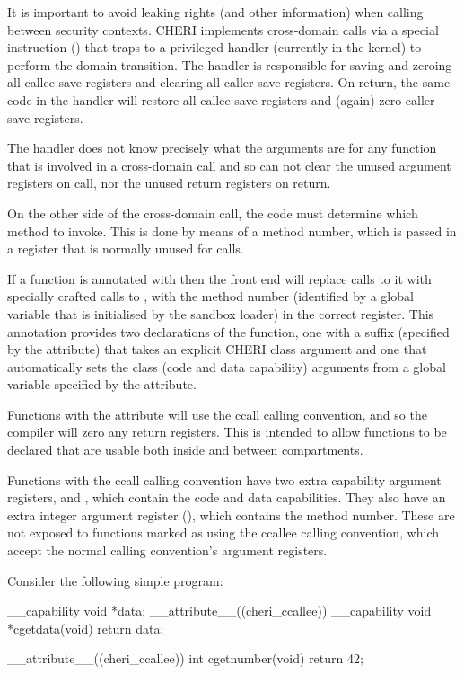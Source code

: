 It is important to avoid leaking rights (and other information) when calling between security contexts.  CHERI implements cross-domain calls via a special instruction () that traps to a privileged handler (currently in the kernel) to perform the domain transition.  The handler is responsible for saving and zeroing all callee-save registers and clearing all caller-save registers.  On return, the same code in the handler will restore all callee-save registers and (again) zero caller-save registers.

The handler does not know precisely what the arguments are for any function that is involved in a cross-domain call and so can not clear the unused argument registers on call, nor the unused return registers on return.

On the other side of the cross-domain call, the code must determine which method to invoke.  This is done by means of a method number, which is passed in a register that is normally unused for calls.

If a function is annotated with  then the front end will replace calls to it with specially crafted calls to , with the method number (identified by a global variable that is initialised by the sandbox loader) in the correct register.
This annotation provides two declarations of the function, one with a suffix (specified by the  attribute) that takes an explicit CHERI class argument and one that automatically sets the class (code and data capability) arguments from a global variable specified by the  attribute.

Functions with the  attribute will use the ccall calling convention, and so the compiler will zero any return registers.  This is intended to allow functions to be declared that are usable both inside and between compartments.

Functions with the ccall calling convention have two extra capability argument registers,  and , which contain the code and data capabilities.  
They also have an extra integer argument register (), which contains the method number.  These are not exposed to functions marked as using the ccallee calling convention, which accept the normal calling convention's argument registers.  

Consider the following simple program:

\begin{csnippet}
__capability void *data;
__attribute__((cheri_ccallee))
__capability void *cgetdata(void)
{
	return data;
}

__attribute__((cheri_ccallee))
int cgetnumber(void)
{
	return 42;
}
\end{csnippet}

